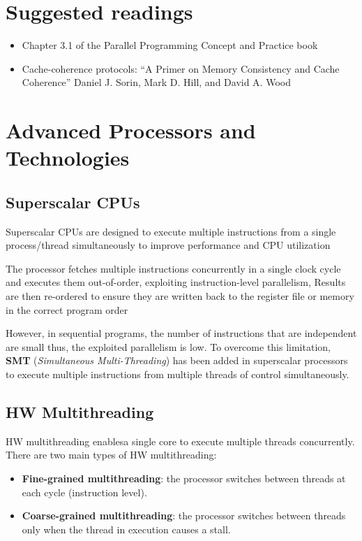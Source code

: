 \section{Suggested readings}
\begin{itemize}
   \item
      Chapter 3.1 of the Parallel Programming Concept and Practice book
   \item
      Cache-coherence protocols: ``A Primer on Memory Consistency and Cache Coherence'' Daniel J. Sorin, Mark D. Hill, and David A. Wood
\end{itemize}

\section{Advanced Processors and Technologies}
\subsection{Superscalar CPUs}
Superscalar CPUs are designed to execute multiple instructions from a single process/thread simultaneously to improve performance and CPU utilization

The processor fetches multiple instructions concurrently in a single clock cycle and executes them out-of-order, exploiting instruction-level parallelism, Results are then re-ordered to ensure they are written back to the register file or memory in the correct program order

However, in sequential programs, the number of instructions that are independent are small thus, the exploited parallelism is low.
To overcome this limitation, \textbf{SMT} (\textit{Simultaneous Multi-Threading}) has been added in superscalar processors to execute multiple instructions from multiple threads of control simultaneously.

\subsection{HW Multithreading}
HW multithreading enablesa single core to execute multiple threads concurrently.
There are two main types of HW multithreading:
\begin{itemize}
   \item \textbf{Fine-grained multithreading}: the processor switches between threads at each cycle (instruction level).
   \item \textbf{Coarse-grained multithreading}: the processor switches between threads only when the thread in execution causes a stall.
\end{itemize}

